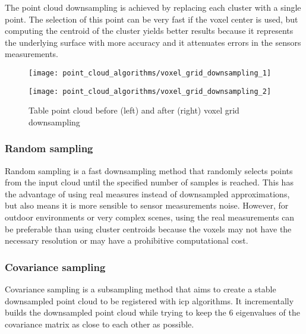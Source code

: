 The point cloud downsampling is achieved by replacing each cluster with a single point. The selection of this point can be very fast if the voxel center is used, but computing the centroid of the cluster yields better results because it represents the underlying surface with more accuracy and it attenuates errors in the sensors measurements.


\begin{figure}[H]
	\centering
	\begin{minipage}[h]{0.495\textwidth}
		\centering
			\texttt{[image: point\_cloud\_algorithms/voxel\_grid\_downsampling\_1]}
	\end{minipage}\hfill
	\begin{minipage}[h]{.495\textwidth}
		\centering
	\texttt{[image: point\_cloud\_algorithms/voxel\_grid\_downsampling\_2]}
	\end{minipage}
	\caption{Table point cloud before (left) and after (right) voxel grid downsampling\protect\footnotemark}
	\label{fig:point-cloud-algorithms_voxel-grid-downsampling}
\end{figure}



\subsubsection{Random sampling}

Random sampling \cite{Vitter1984} is a fast downsampling method that randomly selects points from the input cloud until the specified number of samples is reached. This has the advantage of using real measures instead of downsampled approximations, but also means it is more sensible to sensor measurements noise. However, for outdoor environments or very complex scenes, using the real measurements can be preferable than using cluster centroids because the voxels may not have the necessary resolution or may have a prohibitive computational cost.


\subsubsection{Covariance sampling}

Covariance sampling \cite{Gelfand} is a subsampling method that aims to create a stable downsampled point cloud to be registered with \gls{icp} algorithms. It incrementally builds the downsampled point cloud while trying to keep the 6 eigenvalues of the covariance matrix as close to each other as possible.

